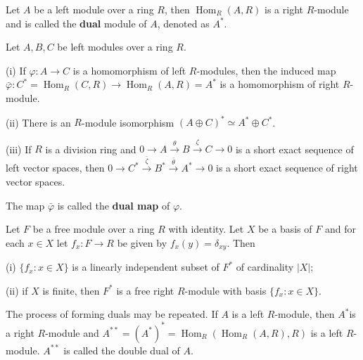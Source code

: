 \documentclass{article}
\DeclareMathOperator{\Hom}{Hom}
\begin{document}
\begin{definition}
    Let $A$ be a left module over a ring $R$, then $\Hom_{R}(A, R)$ is a right $R$-module and is called the \textbf{dual} module of $A$, denoted as $A^*$.
\end{definition}

\begin{theorem}
    Let $A,B,C$ be left modules over a ring $R$.

    (i) If $\varphi:A\to C$ is a homomorphism of left $R$-modules, then the induced map $\bar{\varphi}:C^*=\Hom_{R}(C, R)\to \Hom_{R}(A, R)=A^*$ is a homomorphism of right $R$-module.

    (ii) There is an $R$-module isomorphism $(A\oplus C)^*\simeq A^*\oplus C^*$.

    (iii) If $R$ is a division ring and $0\to A\xrightarrow{\theta}B\xrightarrow{\zeta}C\to 0$ is a short exact sequence of left vector spaces, then $0\to C^*\xrightarrow{\bar{\zeta}}B^*\xrightarrow{\bar{\theta}}A^*\to 0$ is a short exact sequence of right vector spaces.
\end{theorem}
The map $\bar{\varphi}$ is called the \textbf{dual map} of $\varphi$.

\begin{theorem}
    Let $F$ be a free module over a ring $R$ with identity. Let $X$ be a basis of $F$ and for each $x \in X$ let $f_x:F\to R$ be given by $f_x(y)=\delta_{xy}$. Then 

    (i) $\{f_x:x \in X\}$ is a linearly independent subset of $F^*$ of cardinality $\left\lvert X \right\rvert $;

    (ii) if $X$ is finite, then $F^*$ is a free right $R$-module with basis $\{f_x:x \in X\}$.
\end{theorem}

The process of forming duals may be repeated. If $A$ is a left $R$-module, then $A^*$is a right $R$-module and $A^{**}=(A^*)^*=\Hom_{R}(\Hom_{R}(A, R), R)$ is a left $R$-module. $A^{**}$ is called the double dual of $A$.
\end{document}
